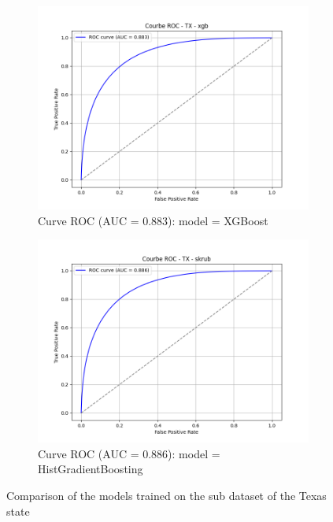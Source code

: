 \begin{figure}[h]
    \begin{subfigure}[b]{0.48\textwidth}
        \includegraphics[width=\textwidth]{Images/curve_roc_folktables/roc_curve_TX_xgb.png}
        \caption{Curve ROC (AUC = 0.883): model = XGBoost}
        \label{fig:TX_xgb}
    \end{subfigure}
    \hfill
    \begin{subfigure}[b]{0.48\textwidth}
        \includegraphics[width=\textwidth]{Images/curve_roc_folktables/roc_curve_TX_skrub.png}
        \caption{Curve ROC (AUC = 0.886): model = HistGradientBoosting}
        \label{fig:TX_skrub}
    \end{subfigure}
    \caption{Comparison of the models trained on the sub dataset of the Texas state}
    \label{fig:roc_tx}
\end{figure}